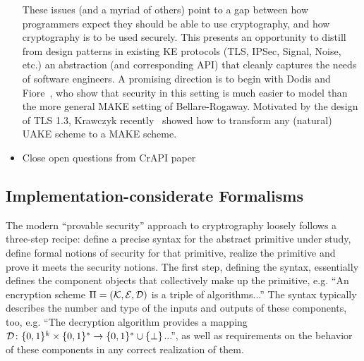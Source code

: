 \begin{itemize}
    These issues (and a myriad of others) point to a gap between how programmers
    expect they should be able to use cryptography, and how cryptography
    is to be used securely. This presents an opportunity to distill from design
    patterns in existing KE protocols (TLS, IPSec, Signal, Noise, etc.) an
    abstraction (and corresponding API) that cleanly captures the needs of
    software engineers.
    A promising direction is to begin with Dodis and
    Fiore~\cite{dodis2017unilateral}, who show that security in this setting is
    much easier to model than the more general MAKE setting of Bellare-Rogaway.
    Motivated by the design of TLS 1.3, Krawczyk
    recently~\cite{krawczyk2016unilateral-to-mutual} showed how to transform any
    (natural) UAKE scheme to a MAKE scheme.

\item {Close open questions from CrAPI paper}
\end{itemize}


\subsection{Implementation-considerate Formalisms}
The modern ``provable security'' approach to cryptrography loosely follows a
three-step recipe: define a precise syntax for the abstract primitive under
study, define formal notions of security for that primitive, realize the
primitive and prove it meets the security notions.  The first step, defining the
syntax, essentially defines the component objects that collectively make up the
primitive, e.g. ``An encryption scheme $\Pi=(\mathcal{K},\mathcal{E},\mathcal{D})$ is a triple of
algorithms...''  The syntax typically describes the number and type of the
inputs and outputs of these components, too, e.g. ``The decryption algorithm
provides a mapping $\mathcal{D}\colon\{0,1\}^{k}\times\{0,1\}^* \to \{0,1\}^* \cup
\{\bot\}$...'', as well as requirements on the behavior of these components in
any correct realization of them.

